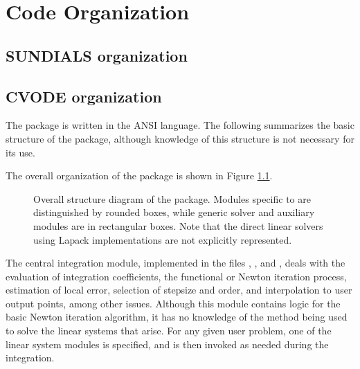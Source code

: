 \chapter{Code Organization}\label{s:organization}

\section{SUNDIALS organization}\label{ss:sun_org}


\section{CVODE organization}\label{ss:cvode_org}

The {\cvode} package is written in the ANSI {\C} language. The following
summarizes the basic structure of the package, although knowledge
of this structure is not necessary for its use.

The overall organization of the {\cvode} package is shown in Figure
\ref{f:cvorg}. 
\begin{figure}
{\centerline{}}
\caption [Overall structure diagram of the {\cvode} package]
{Overall structure diagram of the {\cvode} package.
  Modules specific to {\cvode} are distinguished by rounded boxes, while 
  generic solver and auxiliary modules are in rectangular boxes. 
  Note that the direct linear solvers using Lapack implementations are not 
  explicitly represented.}
\label{f:cvorg}
\end{figure}
The central integration module, implemented in the files ,
, and , deals with the evaluation of integration
coefficients, the functional or Newton iteration process, estimation of local
error, selection of stepsize and order, and interpolation to user output
points, among other issues.  Although this module contains logic for
the basic Newton iteration algorithm, it has no knowledge of the
method being used to solve the linear systems that arise.  For any
given user problem, one of the linear system modules is specified, and
is then invoked as needed during the integration. 

